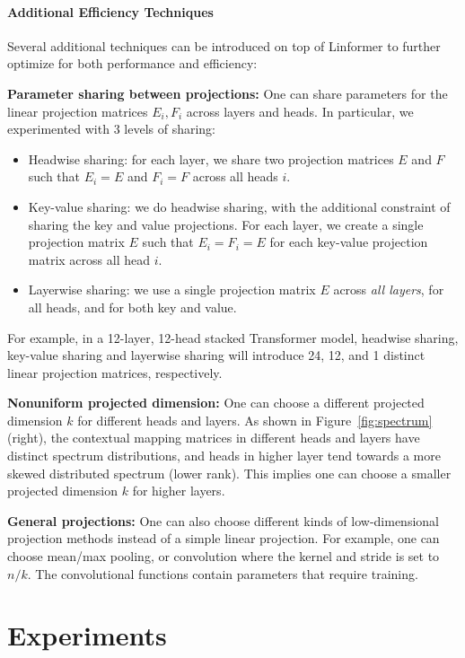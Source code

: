 \paragraph{Additional Efficiency Techniques} Several additional techniques can be introduced on top of Linformer to further optimize for both performance and efficiency:

\textbf{Parameter sharing between projections:} One can share parameters for the linear projection matrices $E_i, F_i$ across layers and heads. In particular, we experimented with 3 levels of sharing:

\begin{itemize}
    \item Headwise sharing: for each layer, we share two projection matrices $E$ and $F$ such that $E_i= E$ and $F_i=F$ across all heads $i$.  
    \item Key-value sharing: we do headwise sharing, with the additional constraint of sharing the key and value projections. For each layer, we create a single projection matrix $E$ such that $E_i = F_i = E$ for each key-value projection matrix across all head $i$.
    \item Layerwise sharing: we use a single projection matrix $E$ across \textit{all layers}, for all heads, and for both key and value. 
\end{itemize}

For example, in a 12-layer, 12-head stacked Transformer model, headwise sharing, key-value sharing and layerwise sharing will introduce 24, 12, and 1 distinct linear projection matrices, respectively. 

\textbf{Nonuniform projected dimension:} One can choose a different projected dimension $k$ for different heads and layers. As shown in Figure~\ref{fig:spectrum} (right), the contextual mapping matrices in different heads and layers have distinct spectrum distributions, and heads in higher layer tend towards a more skewed distributed spectrum (lower rank). This implies one can choose a smaller projected dimension $k$ for higher layers. 

\textbf{General projections:} One can also choose different kinds of low-dimensional projection methods instead of a simple linear projection. For example, one can choose mean/max pooling, or convolution where the kernel and stride is set to $n/k$. The convolutional functions contain parameters that require training.

\section{Experiments}


